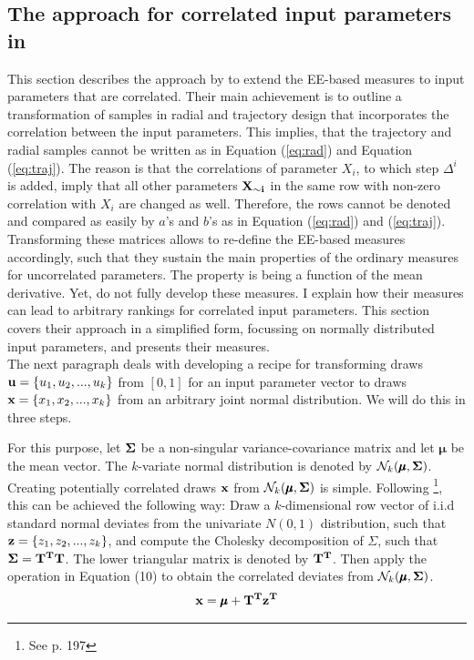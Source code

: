\subsection{The approach for correlated input parameters in \cite{ge2017extending}}

This section describes the approach by \cite{ge2017extending} to extend the EE-based measures to input parameters that are correlated. Their main achievement is to outline a transformation of samples in radial and trajectory design that incorporates the correlation between the input parameters. This implies, that the trajectory and radial samples cannot be written as in Equation (\ref{eq:rad}) and Equation (\ref{eq:traj}). The reason is that the correlations of parameter $X_i$, to which step $\Delta^i$ is added, imply that all other parameters $\bold{X_{\sim i}}$ in the same row with non-zero correlation with $X_i$ are changed as well. Therefore, the rows cannot be denoted and compared as easily by $a$'s and $b$'s as in Equation (\ref{eq:rad}) and (\ref{eq:traj}). Transforming these matrices allows to re-define the EE-based measures accordingly, such that they sustain the main properties of the ordinary measures for uncorrelated parameters. The property is being a function of the mean derivative. Yet, \cite{ge2017extending} do not fully develop these measures. I explain how their measures can lead to arbitrary rankings for correlated input parameters. This section covers their approach in a simplified form, focussing on normally distributed input parameters, and presents their measures.\\

\noindent
The next paragraph deals with developing a recipe for transforming draws $\bold{u} = \{u_1, u_2, ..., u_k\}$ from $[0,1]$ for an input parameter vector to draws $\bold{x} = \{x_1, x_2, ..., x_k\}$ from an arbitrary joint normal distribution. We will do this in three steps. 

For this purpose, let $\bold{\Sigma}$ be a non-singular variance-covariance matrix and let $\pmb{\mu}$ be the mean vector. The $k$-variate normal distribution is denoted by $\mathcal{N}_k(\pmb{\mu}, \bold{\Sigma})$. \\

\noindent
Creating potentially correlated draws $\bold{x}$ from $\mathcal{N}_k(\pmb{\mu}, \bold{\Sigma})$ is simple. Following \cite{gentle2006random}\footnote{See p. 197}, this can be achieved the following way: Draw a $k$-dimensional row vector of i.i.d standard normal deviates from the univariate $N(0,1)$ distribution, such that  $\bold{z} = \{z_1, z_2, ..., z_k\}$, and compute the Cholesky decomposition of $\Sigma$, such that $\bold{\Sigma} = \bold{T^T T}$. The lower triangular matrix is denoted by $\bold{T^T}$. Then apply the operation in Equation (10) to obtain the correlated deviates from $\mathcal{N}_k(\pmb{\mu}, \bold{\Sigma})$.
\begin{align}
\bold{x} = \pmb{\mu} + \bold{T^T z^T} 
\end{align}

